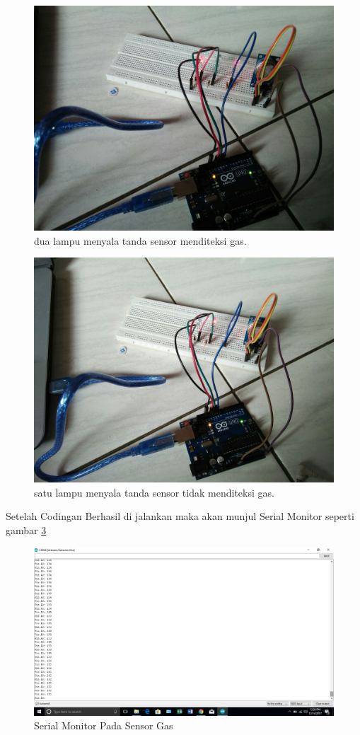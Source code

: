 \begin{figure}[ht]
	\centerline{\includegraphics[width=1\textwidth]{figures/terditeksi.jpg}}
	\caption{dua lampu menyala tanda sensor menditeksi gas.}
	\label{sensor:terditeksi}
	\end{figure}
\begin{figure}[ht]
	\centerline{\includegraphics[width=1\textwidth]{figures/tidakterditeksi.jpg}}
	\caption{satu lampu menyala tanda sensor tidak menditeksi gas.}
	\label{sensor:tidakterditeksi}
	\end{figure}
	
Setelah Codingan Berhasil di jalankan maka akan munjul Serial Monitor seperti gambar  \ref{Sensor:SerialMonitor}
\begin{figure}[ht]
	\centerline{\includegraphics[width=1\textwidth]{figures/SerialMonitor.png}}
	\caption{Serial Monitor Pada Sensor Gas}
	\label{Sensor:SerialMonitor}
	\end{figure}